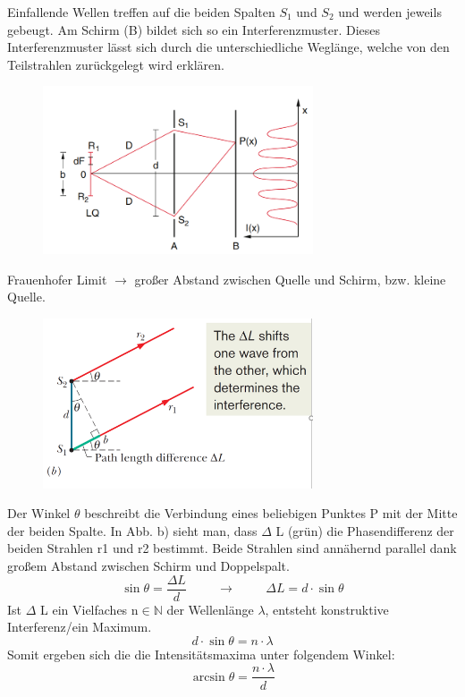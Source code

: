 \documentclass[a4paper, 11pt, ngerman, parskip=half]{scrartcl}
\begin{document}
Einfallende Wellen treffen auf die beiden Spalten $S_1$ und $S_2$ und werden jeweils gebeugt. Am Schirm (B) bildet sich so ein Interferenzmuster. 
Dieses Interferenzmuster lässt sich durch die unterschiedliche Weglänge, welche von den Teilstrahlen zurückgelegt wird erklären.
\begin{figure}[H]
    \centering
    \includegraphics[width=8cm]{image/18_Interferenz/Youngscher_Doppelspalt.png}
\end{figure}
Frauenhofer Limit $\rightarrow$ großer Abstand zwischen Quelle und Schirm, bzw. kleine Quelle.
\begin{figure}[H]
    \centering
    \includegraphics[width=8cm]{image/18_Interferenz/Doppelspalt_Wegunterschied.png}
\end{figure}
Der Winkel $\theta$ beschreibt die Verbindung eines beliebigen Punktes P mit der Mitte der beiden Spalte. 
In Abb. b) sieht man, dass $\Delta$ L (grün) die Phasendifferenz der beiden Strahlen r1 und r2 bestimmt. Beide 
Strahlen sind annähernd parallel dank großem Abstand zwischen Schirm und Doppelspalt. 
\[\sin \theta = \frac{\Delta L}{d} \hspace{1cm} \rightarrow \hspace{1cm} \Delta L = d \cdot \sin \theta\]
Ist $\Delta$ L ein Vielfaches n$\in\mathbb{N}$ der Wellenlänge $\lambda$, entsteht konstruktive Interferenz/ein Maximum.
\[d \cdot \sin \theta = n \cdot \lambda\]
Somit ergeben sich die die Intensitätsmaxima unter folgendem Winkel:
\begin{equation}
    \label{eq:Intensitaetsmaxima_Young_Doppelspalt}
    \arcsin \theta = \frac{n \cdot \lambda}{d}
\end{equation}
\end{document}
